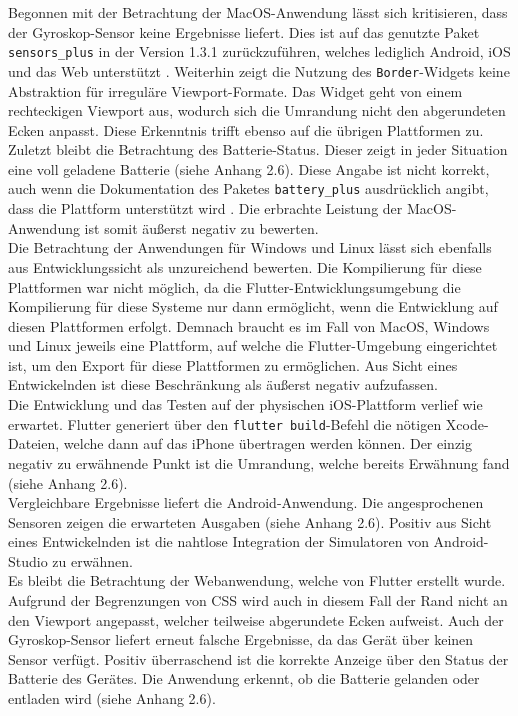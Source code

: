 \documentclass[a4paper]{scrartcl}
\begin{document}
Begonnen mit der Betrachtung der MacOS-Anwendung lässt sich kritisieren, dass der Gyroskop-Sensor keine Ergebnisse liefert. Dies ist auf das genutzte Paket \texttt{sensors\_plus} in der Version 1.3.1 zurückzuführen, welches lediglich Android, iOS und das Web unterstützt \autocite{sensors_plus}. Weiterhin zeigt die Nutzung des \texttt{Border}-Widgets keine Abstraktion für irreguläre Viewport-Formate. Das Widget geht von einem rechteckigen Viewport aus, wodurch sich die Umrandung nicht den abgerundeten Ecken anpasst. Diese Erkenntnis trifft ebenso auf die übrigen Plattformen zu. Zuletzt bleibt die Betrachtung des Batterie-Status. Dieser zeigt in jeder Situation eine voll geladene Batterie (siehe Anhang 2.6). Diese Angabe ist nicht korrekt, auch wenn die Dokumentation des Paketes \texttt{battery\_plus} ausdrücklich angibt, dass die Plattform unterstützt wird \autocite{battery_plus}. Die erbrachte Leistung der MacOS-Anwendung ist somit äußerst negativ zu bewerten. \\

Die Betrachtung der Anwendungen für Windows und Linux lässt sich ebenfalls aus Entwicklungssicht als unzureichend bewerten. Die Kompilierung für diese Plattformen war nicht möglich, da die Flutter-Entwicklungsumgebung die Kompilierung für diese Systeme nur dann ermöglicht, wenn die Entwicklung auf diesen Plattformen erfolgt. Demnach braucht es im Fall von MacOS, Windows und Linux jeweils eine Plattform, auf welche die Flutter-Umgebung eingerichtet ist, um den Export für diese Plattformen zu ermöglichen. Aus Sicht eines Entwickelnden ist diese Beschränkung als äußerst negativ aufzufassen. \\

Die Entwicklung und das Testen auf der physischen iOS-Plattform verlief wie erwartet. Flutter generiert über den \texttt{flutter build}-Befehl die nötigen Xcode-Dateien, welche dann auf das iPhone übertragen werden können. Der einzig negativ zu erwähnende Punkt ist die Umrandung, welche bereits Erwähnung fand (siehe Anhang 2.6). \\

Vergleichbare Ergebnisse liefert die Android-Anwendung. Die angesprochenen Sensoren zeigen die erwarteten Ausgaben (siehe Anhang 2.6). Positiv aus Sicht eines Entwickelnden ist die nahtlose Integration der Simulatoren von Android-Studio zu erwähnen. \\

Es bleibt die Betrachtung der Webanwendung, welche von Flutter erstellt wurde. Aufgrund der Begrenzungen von CSS wird auch in diesem Fall der Rand nicht an den Viewport angepasst, welcher teilweise abgerundete Ecken aufweist. Auch der Gyroskop-Sensor liefert erneut falsche Ergebnisse, da das Gerät über keinen  Sensor verfügt. Positiv überraschend ist die korrekte Anzeige über den Status der Batterie des Gerätes. Die Anwendung erkennt, ob die Batterie gelanden oder entladen wird (siehe Anhang 2.6). \\
\end{document}
